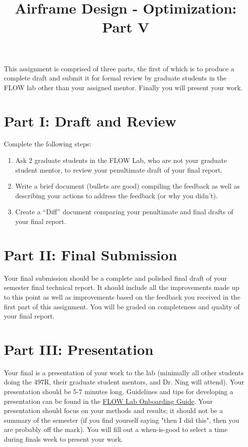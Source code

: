 \documentclass[12pt]{article}
\title{Airframe Design - Optimization: Part V}
\date{}
\begin{document}
\maketitle
\vspace{-3.5cm}

This assignment is comprised of three parts, the first of which is to produce a complete draft and submit it for formal review by graduate students in the FLOW lab other than your assigned mentor. Finally you will present your work.
	
\section{Part I: Draft and Review}

 Complete the following steps:



\begin{enumerate}[label=\alph*.]
	\item Ask 2 graduate students in the FLOW Lab, who are not your graduate student mentor, to review your penultimate draft of your final report.
	\item Write a brief document (bullets are good) compiling the feedback as well as describing your actions to address the feedback (or why you didn't).
	\item Create a ``Diff'' document comparing your penultimate and final drafts of your final report.
\end{enumerate}



\section{Part II: Final Submission}

Your final submission should be a complete and polished final draft of your semester final technical report.
It should include all the improvements made up to this point as well as improvements based on the feedback you received in the first part of this assignment.
You will be graded on completeness and quality of your final report.


\section{Part III: Presentation}
Your final is a presentation of your work to the lab (minimally all other students doing the 497R, their graduate student mentors, and Dr. Ning will attend). Your presentation should be 5-7 minutes long. Guidelines and tips for developing a presentation can be found in the \href{https://flow.byu.edu/onboarding/presentations/}{FLOW Lab Onboarding Guide}. Your presentation should focus on your methods and results; it should not be a summary of the semester (if you find yourself saying "then I did this", then you are probably off the mark). You will fill out a when-is-good to select a time during finals week to present your work. 
	
\end{document}
